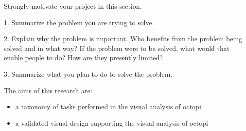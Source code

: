 
Strongly motivate your project in this section.

1. Summarize the problem you are trying to solve.

2. Explain why the problem is important. Who benefits from the problem being
solved and in what way? If the problem were to be solved, what would that
enable people to do? How are they presently limited?

3. Summarize what you plan to do to solve the problem.

The aims of this research are:
\begin{itemize}
  \item a taxonomy of tasks performed in the visual analysis of octopi 
  \item a validated visual design supporting the visual analysis of octopi
\end{itemize}

